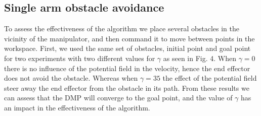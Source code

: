 \documentclass[a4paper, 10pt, conference]{ieeeconf}      %
\begin{document}
\subsection{Single arm obstacle avoidance} %
 To assess the effectiveness of the algorithm we place several obstacles in the vicinity of the manipulator, and then command it to move between points in the workspace. First, we used the same set of obstacles, initial point and goal point for two experiments with two different values for $\gamma$ as seen in Fig. 4. When $\gamma=0$ there is no influence of the potential field in the velocity, hence the end effector does not avoid the obstacle. Whereas when $\gamma=35$ the effect of the potential field steer away the end effector from the obstacle in its path. From these results we can assess that the DMP will converge to the goal point, and the value of $\gamma$ has an impact in the effectiveness of the algorithm. 
\end{document}
